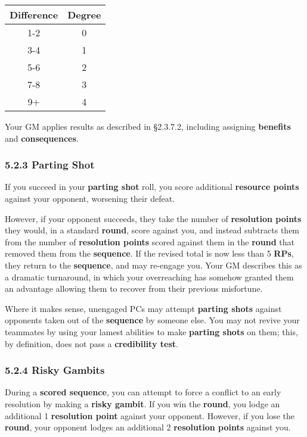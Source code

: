 \documentclass[
  11pt,
]{article}
\begin{document}
\begin{longtable}[]{@{}cc@{}}
\toprule
Difference & Degree \\
\midrule
\endhead
1-2 & 0 \\
3-4 & 1 \\
5-6 & 2 \\
7-8 & 3 \\
9+ & 4 \\
\bottomrule
\end{longtable}

Your GM applies results as described in §2.3.7.2, including assigning
\textbf{benefits} and \textbf{consequences}.

\hypertarget{parting-shot-1}{%
\subsubsection{5.2.3 Parting Shot}\label{parting-shot-1}}

If you succeed in your \textbf{parting shot} roll, you score additional
\textbf{resource points} against your opponent, worsening their defeat.

However, if your opponent succeeds, they take the number of
\textbf{resolution points} they would, in a standard \textbf{round},
score against you, and instead subtracts them from the number of
\textbf{resolution points} scored against them in the \textbf{round}
that removed them from the \textbf{sequence}. If the revised total is
now less than 5 \textbf{RPs}, they return to the \textbf{sequence}, and
may re-engage you. Your GM describes this as a dramatic turnaround, in
which your overreaching has somehow granted them an advantage allowing
them to recover from their previous misfortune.

Where it makes sense, unengaged PCs may attempt \textbf{parting shots}
against opponents taken out of the \textbf{sequence} by someone else.
You may not revive your teammates by using your lamest abilities to make
\textbf{parting shots} on them; this, by definition, does not pass a
\textbf{credibility test}.

\hypertarget{risky-gambits}{%
\subsubsection{5.2.4 Risky Gambits}\label{risky-gambits}}

During a \textbf{scored sequence}, you can attempt to force a conflict
to an early resolution by making a \textbf{risky gambit}. If you win the
\textbf{round}, you lodge an additional 1 \textbf{resolution point}
against your opponent. However, if you lose the \textbf{round}, your
opponent lodges an additional 2 \textbf{resolution points} against you.
\end{document}
